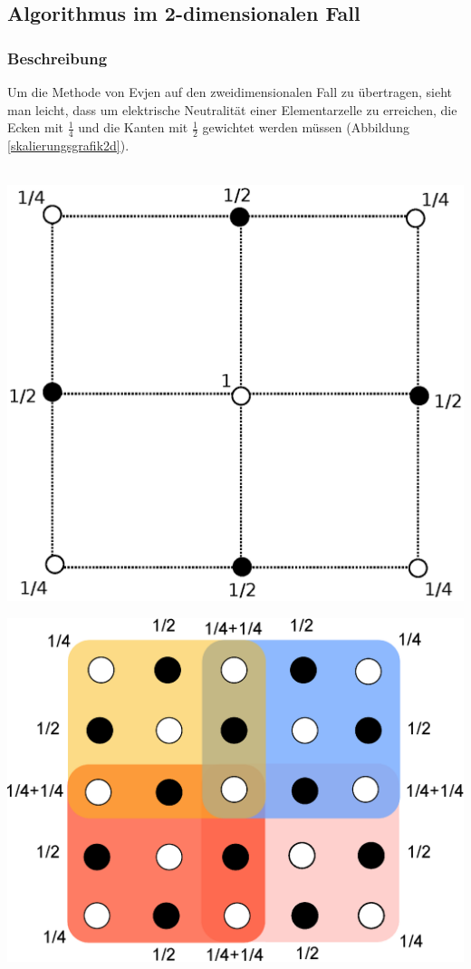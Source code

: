 \documentclass[10pt,a4paper]{article}
\begin{document}
\subsection{Algorithmus im 2-dimensionalen Fall}
\subsubsection{Beschreibung}
Um die Methode von Evjen auf den zweidimensionalen Fall zu übertragen, sieht man leicht,
dass um elektrische Neutralität einer Elementarzelle zu erreichen, die Ecken mit $\frac{1}{4}$
und die Kanten mit $\frac{1}{2}$ gewichtet werden müssen (Abbildung \ref{skalierungsgrafik2d}).
\\
\\
\begin{minipage}[c]{0.5\textwidth}
\begin{center}
\includegraphics[height=0.65\textwidth]{./figures/quadrat.eps}
\label{skalierungsgrafik2d}
\end{center}
\end{minipage}
\begin{minipage}[c]{0.5\textwidth}
\begin{center}
\includegraphics[height=0.65\textwidth]{./figures/elementarzelle.eps}
\label{zellensumme}
\end{center}
\end{minipage}
	
\end{document}
